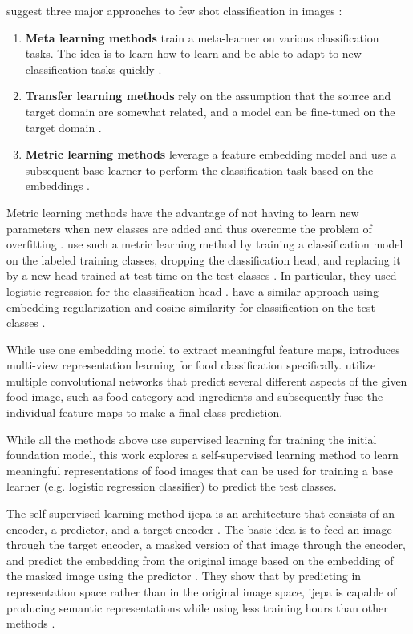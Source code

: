 \citeauthor{li_deep_2023} suggest three major approaches to few shot classification in images \cite{li_deep_2023}:
\begin{enumerate}
	\item{\textbf{Meta learning methods} train a meta-learner on various classification tasks. The idea is to learn
	how to learn and be able to adapt to new classification tasks quickly \cite{li_deep_2023}.}
	\item{\textbf{Transfer learning methods} rely on the assumption that the source and target domain are 
	somewhat related, and a model can be fine-tuned on the target domain \cite{li_deep_2023}.}
	\item{\textbf{Metric learning methods} leverage a feature embedding model and use a subsequent base learner 
	to perform the classification task based on the embeddings \cite{li_deep_2023}.}
\end{enumerate}

Metric learning methods have the advantage of not having to learn new parameters when new classes are added 
and thus overcome the problem of overfitting \cite{li_deep_2023}. \citeauthor{tian_rethinking_2020} use such a metric learning method by training a classification model on the labeled training classes, 
dropping the classification head, and replacing it by a new head trained at test time on the test classes \cite{tian_rethinking_2020}. In particular, they used logistic regression for the classification head \cite{tian_rethinking_2020}. 
\citeauthor{dhillon_baseline_2020} have a similar approach using embedding regularization and cosine similarity 
for classification on the test classes \cite{dhillon_baseline_2020}.

While \cite{tian_rethinking_2020, dhillon_baseline_2020} use one embedding model to extract meaningful feature maps, 
\cite{jiang_few-shot_2020} introduces multi-view representation learning for food classification specifically.
\citeauthor{jiang_few-shot_2020} utilize multiple convolutional networks that predict several different aspects 
of the given food image, such as food category and ingredients and subsequently fuse the individual feature maps to 
make a final class prediction.

While all the methods above use supervised learning for training the initial foundation model, this work 
explores a self-supervised learning method to learn meaningful representations of food images that can 
be used for training a base learner (e.g. logistic regression classifier) to predict the test classes.

The self-supervised learning method \gls{ijepa} is an architecture that consists of an encoder, a predictor, and a 
target encoder \cite{assran_self-supervised_2023}. The basic idea is to feed an image through the target encoder,
a masked version of that image through the encoder, and predict the embedding from the original image based 
on the embedding of the masked image using the predictor \cite{assran_self-supervised_2023}. They show that 
by predicting in representation space rather than in the original image space, \gls{ijepa} is capable of 
producing semantic representations while using less training hours than other methods \cite{assran_self-supervised_2023}.
